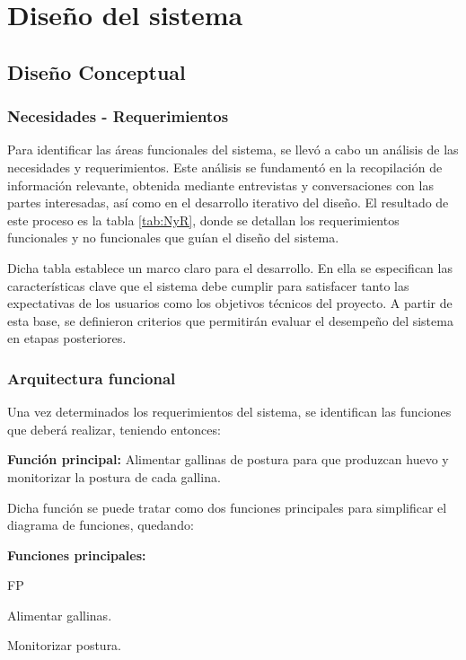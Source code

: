 \chapter{Diseño del sistema}
%
\section{Diseño Conceptual}
%
\subsection{Necesidades - Requerimientos}


Para identificar las áreas funcionales del sistema, se llevó a cabo un análisis de las necesidades y requerimientos. Este análisis se fundamentó en la recopilación de información relevante, obtenida mediante entrevistas y conversaciones con las partes interesadas, así como en el desarrollo iterativo del diseño. El resultado de este proceso es la tabla \ref{tab:NyR}, donde se detallan los requerimientos funcionales y no funcionales que guían el diseño del sistema.

Dicha tabla establece un marco claro para el desarrollo. En ella se especifican las características clave que el sistema debe cumplir para satisfacer tanto las expectativas de los usuarios como los objetivos técnicos del proyecto. A partir de esta base, se definieron criterios que permitirán evaluar el desempeño del sistema en etapas posteriores.



\subsection{Arquitectura funcional} 


Una vez determinados los requerimientos del sistema, se identifican las funciones que deberá realizar, teniendo entonces:

\textbf{Función principal:}
Alimentar gallinas de postura para que produzcan huevo y monitorizar la postura de cada gallina.

Dicha función se puede tratar como dos funciones principales para simplificar el diagrama de funciones, quedando:

\textbf{Funciones principales:}
\begin{afunc}{FP}
    \item Alimentar gallinas.
    \item Monitorizar postura.
\end{afunc}

